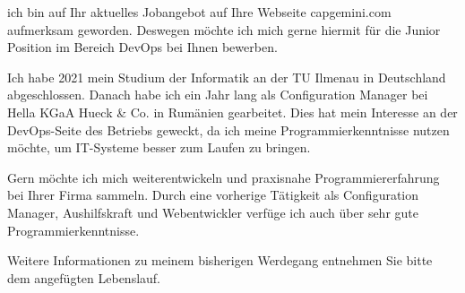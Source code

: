 \documentclass[fontsize=12pt,parskip=half-]{scrartcl}
\begin{document}
\begin{Anschreiben}




ich bin auf Ihr aktuelles Jobangebot auf Ihre Webseite capgemini.com aufmerksam geworden. Deswegen möchte ich mich gerne hiermit für die Junior Position im Bereich DevOps bei Ihnen bewerben. 

Ich habe 2021 mein Studium der Informatik an der TU Ilmenau in Deutschland abgeschlossen. Danach habe ich ein Jahr lang als Configuration Manager bei Hella KGaA Hueck \& Co. in Rumänien gearbeitet. Dies hat mein Interesse an der DevOps-Seite des Betriebs geweckt, da ich meine Programmierkenntnisse nutzen möchte, um IT-Systeme besser zum Laufen zu bringen. 

Gern möchte ich mich weiterentwickeln und praxisnahe Programmiererfahrung bei Ihrer Firma sammeln. Durch eine vorherige Tätigkeit als Configuration Manager, Aushilfskraft und Webentwickler verfüge ich auch über sehr gute Programmierkenntnisse. 

Weitere Informationen zu meinem bisherigen Werdegang entnehmen Sie bitte dem angefügten Lebenslauf. 
\end{Anschreiben}






\UeberschriftGroesse{\LARGE}            %
\end{document}
